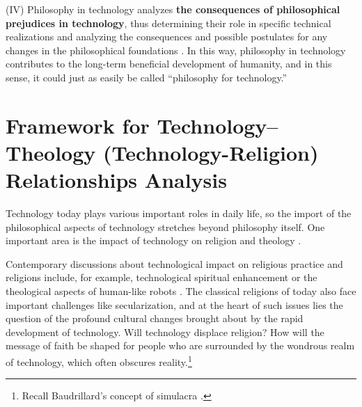 (IV) Philosophy in technology analyzes \textbf{the consequences of philosophical prejudices in technology}, thus determining their role in specific technical realizations and analyzing the consequences and possible postulates for any changes in the philosophical foundations 
\parencites[e.g][]{smith_promise_2019}[][]{suchacka_human_2021}[][]{wieczorek_conscience_2021}. %
 In this way, philosophy in technology contributes to the long-term beneficial development of humanity, and in this sense, it could just as easily be called ``philosophy for technology.''



\section{Framework for Technology–Theology (Technology-Religion) Relationships Analysis}


Technology today plays various important roles in daily life, so the import of the philosophical aspects of technology stretches beyond philosophy itself. One important area is the impact of technology on religion and theology 
\parencite[e.g][]{salamon_religia_2016}.%




Contemporary discussions about technological impact on religious practice and religions include, for example, technological spiritual enhancement 
\parencite[e.g][]{wildman_spirit_2021} %
 or the theological aspects of human-like robots 
\parencite[][]{balle_theological_2022}. %
 The classical religions of today also face important challenges like secularization, and at the heart of such issues lies the question of the profound cultural changes brought about by the rapid development of technology. Will technology displace religion? How will the message of faith be shaped for people who are surrounded by the wondrous realm of technology, which often obscures reality.\footnote{Recall Baudrillard's concept of simulacra 
\parencite[][]{baudrillard_simulacra_1994}.%
}



